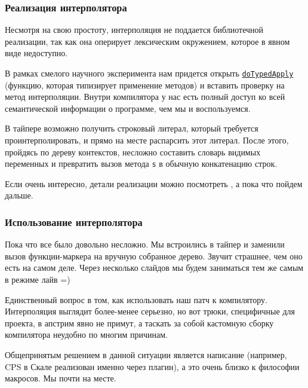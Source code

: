 \documentclass[hyperref={bookmarks=false}]{beamer}
\begin{document}
\begin{frame}[t,fragile]
\frametitle{Реализация интерполятора}

Несмотря на свою простоту, интерполяция не поддается библиотечной реализации, так как она оперирует лексическим окружением, которое в явном виде недоступно.

В рамках смелого научного эксперимента нам придется открыть \texttt{\color{linkblue}\href{https://github.com/xeno-by/alphakeplerdemo/blob/sources/src/compiler/scala/tools/nsc/typechecker/Typers.scala\#L2263}{doTypedApply}} (функцию, которая типизирует применение методов) и вставить проверку на метод интерполяции. Внутри компилятора у нас есть полный доступ ко всей семантической информации о программе, чем мы и воспользуемся.

В тайпере возможно получить строковый литерал, который требуется проинтерполировать, и прямо на месте распарсить этот литерал. После этого, пройдясь по дереву контекстов, несложно составить словарь видимых переменных и превратить вызов метода \texttt{s} в обычную конкатенацию строк.

Если очень интересно, детали реализации можно посмотреть , а пока что пойдем дальше.
\end{frame}

\begin{frame}[t,fragile]
\frametitle{Использование интерполятора}

Пока что все было довольно несложно. Мы встроились в тайпер и заменили вызов функции-маркера на вручную собранное дерево. Звучит страшнее, чем оно есть на самом деле. Через несколько слайдов мы будем заниматься тем же самым в режиме лайв =)

Единственный вопрос в том, как использовать наш патч к компилятору. Интерполяция выглядит более-менее серьезно, но вот трюки, специфичные для проекта, в апстрим явно не примут, а таскать за собой кастомную сборку компилятора неудобно по многим причинам.

Общепринятым решением в данной ситуации является написание  (например, CPS в Скале реализован именно через плагин), а это очень близко к философии макросов. Мы почти на месте.
\end{frame}
\end{document}
